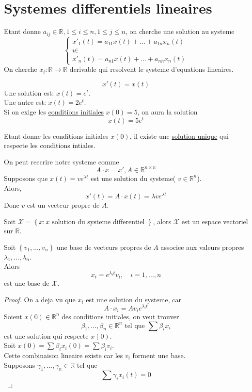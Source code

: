 \documentclass[../main.tex]{subfiles}
\begin{document}
\section{Systemes differentiels lineaires}
Etant donne $a_{ij} \in \mathbb{R}, 1 \leq i \leq n, 1 \leq j \leq n$, on cherche une solution au systeme
\[ 
\begin{cases}
	x'_1( t) = a_{11}x( t)  + \ldots + a_{1n} x_n( t) \\u
	\vdots\\
	x'_n( t) = a_{n1}x( t)  + \ldots + a_{nn} x_n( t) 
\end{cases}
\]
On cherche $x_i: \mathbb{R}\to \mathbb{R}$ derivable qui resolvent le systeme d'equations lineaires.
\begin{exemple}
\[ 
	x'( t) = x( t) 
\]
Une solution est: $x( t) = e^{t} $.\\
Une autre est: $x( t) = 2 e^{t} $. \\
Si on exige les \underline{conditions initiales} $x( 0) =5$, on aura la solution
\[ 
	x( t) = 5 e^{t} 
\]
\end{exemple}
\begin{thm}
	Etant donne les conditions initiales $x( 0) $, il existe une \underline{solution unique} qui respecte les conditions intiales.
\end{thm}
On peut reecrire notre systeme comme
\[ 
A \cdot x = x', A \in \mathbb{R}^{n\times n}
\]
Supposons que $x( t) = v e^{\lambda t} $ est une solution du systeme( $v \in \mathbb{R}^n$).\\
Alors,
\[ 
	x'( t) = A \cdot x( t) = \lambda v e^{\lambda t} 
\]
Donc $v$ est un vecteur propre de $A$.
\begin{lemma}
Soit $\mathcal{X} = \left\{ x : x \text{ solution du systeme differentiel }  \right\} $, alors $\mathcal{X}$ est un espace vectoriel sur $\mathbb{R}$.
\end{lemma}
\begin{thm}
	Soit $ \left\{ v_1, \ldots, v_n \right\} $ une base de vecteurs propres de $A$ associee aux valeurs propres $\lambda_1, \ldots, \lambda_n$.\\
	Alors
	\[ 
	x_i = e^{\lambda_i t}  v_i, \quad i = 1, \ldots, n
	\]
est une base de $ \mathcal{X}$.	
	
\end{thm}
\begin{proof}
On a deja vu que $x_i$ est une solution du systeme, car
\[ 
A \cdot x_i = A v_i e^{\lambda_i t} 
\]
Soient $x( 0) \in \mathbb{R}^n$ des conditions initiales, on veut trouver 
\[ 
\beta_1 , \ldots, \beta_n \in \mathbb{R}^n \text{ tel que } \sum \beta_i x_i 
\]
est une solution qui respecte $x( 0) $.\\
Soit $x( 0) = \sum \beta_i x_i( 0) = \sum \beta_i v_i$.\\
Cette combinaison lineaire existe car les $v_i$ forment une base.\\
Supposons $\gamma_1,\ldots, \gamma_n \in \mathbb{R}$ tel que
\[ 
	\sum \gamma_i x_i ( t) =0
\]

\end{proof}
\end{document}
